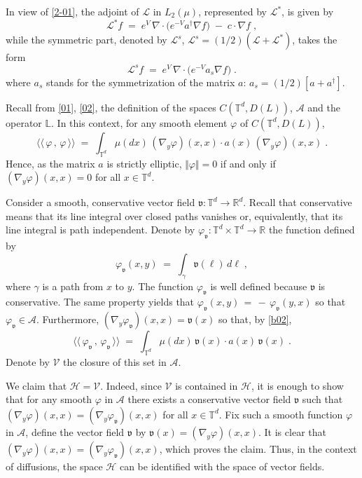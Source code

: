 \documentclass[reqno]{amsart}
\newcounter{as}[section]
\newcommand{\mc}[1]{{\mathcal #1}}
\newcommand{\mf}[1]{{\mathfrak #1}}
\newcommand{\bb}[1]{{\mathbb #1}}
\newcommand{\ms}[1]{{\mathscr #1}}
\newcommand{\<}{\langle}
\renewcommand{\>}{\rangle}
\begin{document}
In view of \eqref{2-01}, the adjoint of $\mc L$ in $L_2(\mu)$,
represented by $\mc L^*$, is given by
\begin{equation*}
\mc L^* f \;=\; e^V \, \nabla \cdot \big( e^{-V} a^\dagger \nabla f\big)
\;-\; c\cdot \nabla f\;,
\end{equation*}
while the symmetric part, denoted by $\mc L^s$, $\mc L^s = (1/2)(\mc L
+ \mc L^*)$, takes the form
\begin{equation}
\label{2-8}
\mc L^s f \;=\; e^V \, \nabla \cdot \big( e^{-V} a_s \nabla f\big) \;.
\end{equation}
where $a_s$ stands for the symmetrization of the matrix $a$:
{\color{blue}$a_s = (1/2)[a + a^\dagger]$}.

Recall from \eqref{01}, \eqref{02}, the definition of the spaces
$C(\bb T^d, D(L))$, $\ms A$ and the operator $\bb L$. In this context,
for any smooth element $\varphi$ of $C(\bb T^d, D(L))$,
\begin{equation}
\label{b02}
\<\!\<\, \varphi \,,\, \varphi \,\>\!\> \;=\;
\int_{\bb T^d} \mu(dx)\, (\nabla_y \varphi)(x,x) \cdot a (x)\,
(\nabla_y \varphi)(x,x) \;.
\end{equation}
Hence, as the matrix $a$ is strictly elliptic, $\Vert \varphi \Vert =0
$ if and only if $(\nabla_y \varphi)(x,x) = 0$ for all $x\in \bb
T^d$.

Consider a smooth, conservative vector field $\mf v : \bb T^d \to \bb
R^d$. Recall that conservative means that its line integral over
closed paths vanishes or, equivalently, that its line integral is path
independent. Denote by $\varphi_{\mf v} : \bb T^d \times \bb T^d \to
\bb R$ the function defined by
\begin{equation*}
\varphi_{\mf v} (x,y) \;=\; \int_\gamma \mf v (\ell) \, d\ell\;,
\end{equation*}
where $\gamma$ is a path from $x$ to $y$. The function $\varphi_{\mf
  v}$ is well defined because $\mf v$ is conservative. The same
property yields that $\varphi_{\mf v} (x,y) \,=\, -\, \varphi_{\mf v}
(y,x)$ so that $\varphi_{\mf v} \in \ms A$. Furthermore, $(\nabla_y
\varphi_{\mf v}) (x,x) = \mf v(x)$ so that, by \eqref{b02},
\begin{equation}
\label{b01}
\<\!\<\, \varphi_{\mf v} \,,\, \varphi_{\mf v} \,\>\!\> \;=\;
\int_{\bb T^d} \mu(dx)\, \mf v(x) \cdot a (x)\,
\mf v (x) \;.
\end{equation}
Denote by $\ms V$ the closure of this set in $\ms A$.

We claim that $\ms H = \ms V$. Indeed, since $\ms V$ is contained in
$\ms H$, it is enough to show that for any smooth $\varphi$ in $\ms A$
there exists a conservative vector field $\mf v$ such that $(\nabla_y
\varphi)(x,x) = (\nabla_y \varphi_{\mf v} )(x,x)$ for all $x\in \bb
T^d$.  Fix such a smooth function $\varphi$ in $\ms A$, define the
vector field $\mf v$ by $\mf v(x)=(\nabla_y \varphi)(x,x)$. It is clear
that $(\nabla_y \varphi)(x,x) = (\nabla_y \varphi_{\mf v} )(x,x)$,
which proves the claim. Thus, in the context of diffusions, the space
$\ms H$ can be identified with the space of vector fields.
\end{document}
